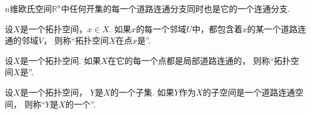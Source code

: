 \begin{proposition}
\(n\)维欧氏空间\(\mathbb{R}^n\)中任何开集的每一个道路连通分支同时也是它的一个连通分支.
\end{proposition}

\begin{definition}
设\(X\)是一个拓扑空间，\(x \in X\).
如果\(x\)的每一个邻域\(U\)中，都包含着\(x\)的某一个道路连通的邻域\(V\)，
则称“拓扑空间\(X\)在点\(x\)是”.
\end{definition}
\begin{definition}
设\(X\)是一个拓扑空间.
如果\(X\)在它的每一个点都是局部道路连通的，
则称“拓扑空间\(X\)是”.
\end{definition}
\begin{definition}
设\(X\)是一个拓扑空间，
\(Y\)是\(X\)的一个子集.
如果\(Y\)作为\(X\)的子空间是一个道路连通空间，
则称“\(Y\)是\(X\)的一个”.
\end{definition}

